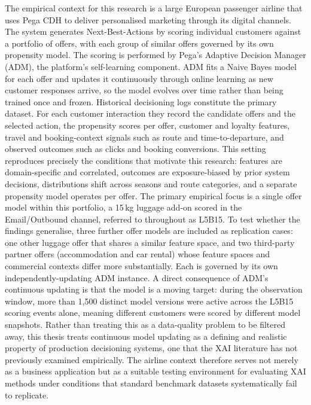 \documentclass[oneside]{memoir} %
\begin{document}
The empirical context for this research is a large European passenger airline that uses Pega CDH to deliver personalised marketing through its digital channels. The system generates Next-Best-Actions by scoring individual customers against a portfolio of offers, with each group of similar offers governed by its own propensity model. The scoring is performed by Pega's Adaptive Decision Manager (ADM), the platform's self-learning component. ADM fits a Naive Bayes model for each offer and updates it continuously through online learning as new customer responses arrive, so the model evolves over time rather than being trained once and frozen. Historical decisioning logs constitute the primary dataset. For each customer interaction they record the candidate offers and the selected action, the propensity scores per offer, customer and loyalty features, travel and booking-context signals such as route and time-to-departure, and observed outcomes such as clicks and booking conversions. This setting reproduces precisely the conditions that motivate this research: features are domain-specific and correlated, outcomes are exposure-biased by prior system decisions, distributions shift across seasons and route categories, and a separate propensity model operates per offer. The primary empirical focus is a single offer model within this portfolio, a 15\,kg luggage add-on scored in the Email/Outbound channel, referred to throughout as L5B15. To test whether the findings generalise, three further offer models are included as replication cases: one other luggage offer that shares a similar feature space, and two third-party partner offers (accommodation and car rental) whose feature spaces and commercial contexts differ more substantially. Each is governed by its own independently-updating ADM instance. A direct consequence of ADM's continuous updating is that the model is a moving target: during the observation window, more than 1{,}500 distinct model versions were active across the L5B15 scoring events alone, meaning different customers were scored by different model snapshots. Rather than treating this as a data-quality problem to be filtered away, this thesis treats continuous model updating as a defining and realistic property of production decisioning systems, one that the XAI literature has not previously examined empirically. The airline context therefore serves not merely as a business application but as a suitable testing environment for evaluating XAI methods under conditions that standard benchmark datasets systematically fail to replicate.
\end{document}
